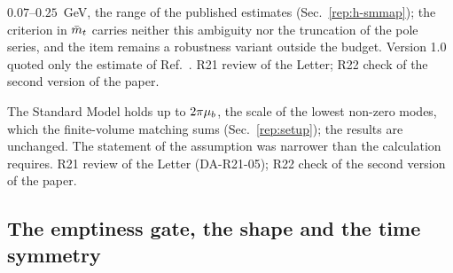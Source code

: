 \begin{description}
{$0.07$--$0.25$~GeV, the range of the published estimates (Sec.~\ref{rep:h-smmap}); the criterion in $\bar m_t$ carries neither this ambiguity nor the truncation of the pole series, and the item remains a robustness variant outside the budget.} %
{Version 1.0 quoted only the estimate of Ref.~\cite{Beneke:2016cbu}.}
{R21 review of the Letter; R22 check of the second version of the paper.}

{The Standard Model holds up to $2\pi\mu_b$, the scale of the lowest non-zero modes, which the finite-volume matching sums (Sec.~\ref{rep:setup}); the results are unchanged.}
{The statement of the assumption was narrower than the calculation requires.}
{R21 review of the Letter (DA-R21-05); R22 check of the second version of the paper.}\end{description}

\subsection{The emptiness gate, the shape and the time symmetry}\label{sec:v23-shape}


